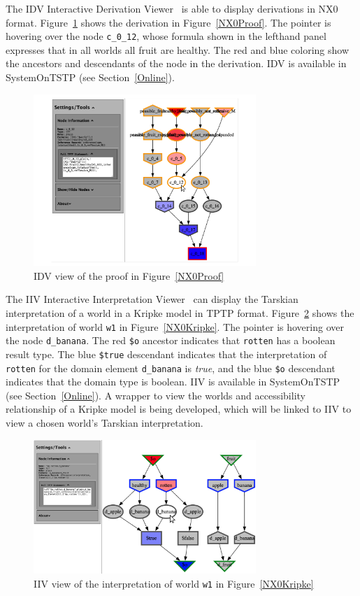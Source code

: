 \documentclass{ceurart}
\begin{document}
The IDV Interactive Derivation Viewer~\cite{TPS07} is able to display derivations in NX0 format.
Figure~\ref{NX0ProofIDV} shows the derivation in Figure~\ref{NX0Proof}.
The pointer is hovering over the node {\tt c\_0\_12}, whose formula shown in the lefthand panel
expresses that in all worlds all fruit are healthy.
The red and blue coloring show the ancestors and descendants of the node in the derivation.
IDV is available in SystemOnTSTP (see Section~\ref{Online}).

\begin{figure}[htbp]
\centering
\includegraphics[width=0.75\textwidth]{NX0ProofIDV.pdf}
\caption{IDV view of the proof in Figure~\ref{NX0Proof}}
\label{NX0ProofIDV}
\end{figure}

The IIV Interactive Interpretation Viewer~\cite{SS+23-LPAR,MS23-Poster} can display the
Tarskian interpretation of a world in a Kripke model in TPTP format.
Figure~\ref{NX0InterpretationW1} shows the interpretation of world {\tt w1} in 
Figure~\ref{NX0Kripke}.
The pointer is hovering over the node {\tt d\_banana}.
The red {\tt \$o} ancestor indicates that {\tt rotten} has a boolean result type.
The blue {\tt \$true} descendant indicates that the interpretation of {\tt rotten} for the
domain element {\tt d\_banana} is {\em true}, and the blue {\tt \$o} descendant indicates that the
domain type is boolean.
IIV is available in SystemOnTSTP (see Section~\ref{Online}).
A wrapper to view the worlds and accessibility relationship of a Kripke model is being developed,
which will be linked to IIV to view a chosen world's Tarskian interpretation.

\begin{figure}[htbp]
\centering
\includegraphics[width=0.75\textwidth]{NX0InterpretationW1.pdf}
\caption{IIV view of the interpretation of world {\tt w1} in Figure~\ref{NX0Kripke}}
\label{NX0InterpretationW1}
\end{figure}
\end{document}
